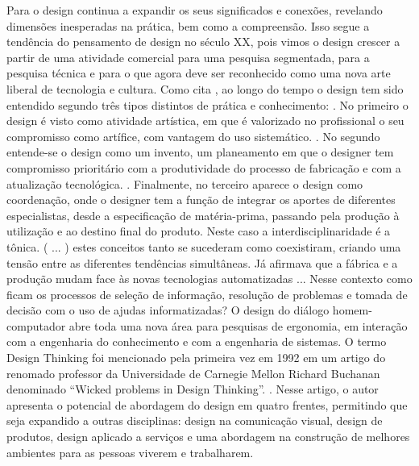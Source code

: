 \documentclass[twoside,twocolumn]{article}
\begin{document}
\newline \indent Para \citep{Buchanan1992} o design continua a expandir os seus significados e conexões, revelando dimensões inesperadas na prática, bem como a compreensão. Isso segue a tendência do pensamento de design no século XX, pois vimos o design crescer a partir de uma atividade comercial para uma pesquisa segmentada, para a pesquisa técnica e para o que agora deve ser reconhecido como uma nova arte liberal de tecnologia e cultura.
\newline \indent Como cita \citep{Niemeyer2000}, ao longo do tempo o design tem sido entendido segundo três tipos distintos de prática e conhecimento:
\newline {}. No primeiro o design é visto como atividade artística, em que é valorizado no profissional o seu compromisso como artífice, com vantagem do uso sistemático. \newline {}. No segundo entende-se o design como um invento, um planeamento em que o designer tem compromisso prioritário com a produtividade do processo de fabricação e com a atualização tecnológica. 
\newline {}. Finalmente, no terceiro aparece o design como coordenação, onde o designer tem a função de integrar os aportes de diferentes especialistas, desde a especificação de matéria-prima, passando pela produção à utilização e ao destino final do produto. Neste caso a interdisciplinaridade é a tônica. ( ... ) estes conceitos tanto se sucederam como coexistiram, criando uma tensão entre as diferentes tendências simultâneas.
\newline \indent Já \citep{Niemeyer2000} afirmava que a fábrica e a produção mudam face às novas tecnologias automatizadas ... Nesse contexto como ficam os processos de seleção de informação, resolução de problemas e tomada de decisão com o uso de ajudas informatizadas? O design do diálogo homem-computador abre toda uma nova área para pesquisas de ergonomia, em interação com a engenharia do conhecimento e com a engenharia de sistemas. 
\newline\indent O termo Design Thinking foi mencionado pela primeira vez em 1992 em um artigo do renomado professor da Universidade de Carnegie Mellon Richard Buchanan denominado “Wicked problems in Design Thinking”. \citep{Buchanan1992}. Nesse artigo, o autor apresenta o potencial de abordagem do design em quatro frentes, permitindo que seja expandido a outras disciplinas: design na comunicação visual, design de produtos, design aplicado a serviços e uma abordagem na construção de melhores ambientes para as pessoas viverem e trabalharem. \citep{FutureJournal2016}
\end{document}
